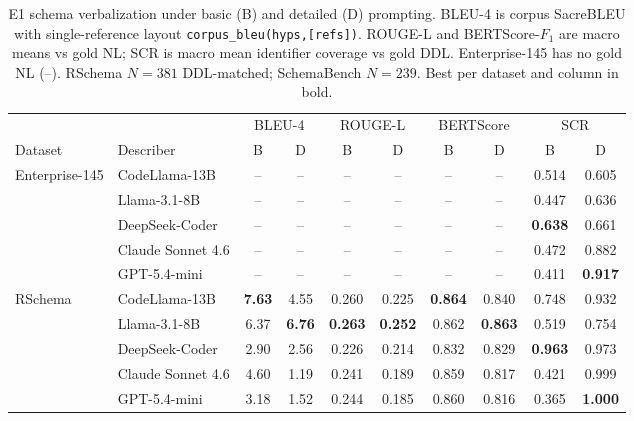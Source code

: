 \begin{table}[t]
\centering
\small
\setlength{\tabcolsep}{3pt}
\renewcommand{\arraystretch}{1.0}
\caption{E1 schema verbalization under basic (B) and detailed (D) prompting.
BLEU-4 is corpus SacreBLEU with single-reference layout \texttt{corpus\_bleu(hyps,[refs])}.
ROUGE-L and BERTScore-$F_1$ are macro means vs gold NL; SCR is macro mean identifier coverage vs gold DDL.
Enterprise-145 has no gold NL (--). RSchema $N{=}381$ DDL-matched; SchemaBench $N{=}239$.
Best per dataset and column in bold.}
\label{tab:e1_s2t}
\begin{tabular}{@{}ll cc cc cc @{\hspace{18pt}} cc@{}}
\toprule
& & \multicolumn{2}{c}{BLEU-4} & \multicolumn{2}{c}{ROUGE-L} & \multicolumn{2}{c}{BERTScore} & \multicolumn{2}{c}{SCR} \\
\cmidrule(lr){3-4}\cmidrule(lr){5-6}\cmidrule(lr){7-8}\cmidrule(lr){9-10}
Dataset & Describer & B & D & B & D & B & D & B & D \\
\midrule
\multirow{5}{*}{Enterprise-145}
& CodeLlama-13B & -- & -- & -- & -- & -- & -- & 0.514 & 0.605 \\
& Llama-3.1-8B & -- & -- & -- & -- & -- & -- & 0.447 & 0.636 \\
& DeepSeek-Coder & -- & -- & -- & -- & -- & -- & \textbf{0.638} & 0.661 \\
& Claude Sonnet 4.6 & -- & -- & -- & -- & -- & -- & 0.472 & 0.882 \\
& GPT-5.4-mini & -- & -- & -- & -- & -- & -- & 0.411 & \textbf{0.917} \\
\midrule
\multirow{5}{*}{RSchema}
& CodeLlama-13B & \textbf{7.63} & 4.55 & 0.260 & 0.225 & \textbf{0.864} & 0.840 & 0.748 & 0.932 \\
& Llama-3.1-8B & 6.37 & \textbf{6.76} & \textbf{0.263} & \textbf{0.252} & 0.862 & \textbf{0.863} & 0.519 & 0.754 \\
& DeepSeek-Coder & 2.90 & 2.56 & 0.226 & 0.214 & 0.832 & 0.829 & \textbf{0.963} & 0.973 \\
& Claude Sonnet 4.6 & 4.60 & 1.19 & 0.241 & 0.189 & 0.859 & 0.817 & 0.421 & 0.999 \\
& GPT-5.4-mini & 3.18 & 1.52 & 0.244 & 0.185 & 0.860 & 0.816 & 0.365 & \textbf{1.000} \\

\end{tabular}
\end{table}
